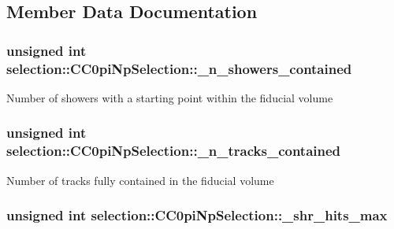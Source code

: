 \subsection{Member Data Documentation}
\hypertarget{classselection_1_1CC0piNpSelection_aebf4a69b8d7f3171ad90c382668c22ec}{
\subsubsection[{\-\_\-n\-\_\-showers\-\_\-contained}]{\setlength{\rightskip}{0pt plus 5cm}unsigned int selection\-::\-C\-C0pi\-Np\-Selection\-::\-\_\-n\-\_\-showers\-\_\-contained\hspace{0.3cm}{\ttfamily [private]}}}\label{classselection_1_1CC0piNpSelection_aebf4a69b8d7f3171ad90c382668c22ec}
Number of showers with a starting point within the fiducial volume \hypertarget{classselection_1_1CC0piNpSelection_a22c5cd4cf8882fa3cbabf25ed86d1f39}{
\subsubsection[{\-\_\-n\-\_\-tracks\-\_\-contained}]{\setlength{\rightskip}{0pt plus 5cm}unsigned int selection\-::\-C\-C0pi\-Np\-Selection\-::\-\_\-n\-\_\-tracks\-\_\-contained\hspace{0.3cm}{\ttfamily [private]}}}\label{classselection_1_1CC0piNpSelection_a22c5cd4cf8882fa3cbabf25ed86d1f39}
Number of tracks fully contained in the fiducial volume \hypertarget{classselection_1_1CC0piNpSelection_a750834ef52299d85f9596bbbafa1dffb}{
\subsubsection[{\-\_\-shr\-\_\-hits\-\_\-max}]{\setlength{\rightskip}{0pt plus 5cm}unsigned int selection\-::\-C\-C0pi\-Np\-Selection\-::\-\_\-shr\-\_\-hits\-\_\-max\hspace{0.3cm}{\ttfamily [private]}}}\label{classselection_1_1CC0piNpSelection_a750834ef52299d85f9596bbbafa1dffb}
